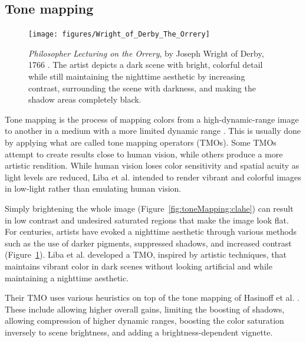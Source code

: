 \documentclass{sig-alternate}
\begin{document}
\subsection{Tone mapping}
\label{sec:toneMapping}

\begin{figure}
\centering
\texttt{[image: figures/Wright\_of\_Derby\_The\_Orrery]}
\caption{ \emph{Philosopher Lecturing on the Orrery}, by Joseph Wright of Derby, 1766 \cite{file:theOrrery}. The artist depicts a dark scene with bright, colorful detail while still maintaining the nighttime aesthetic by increasing contrast, surrounding the scene with darkness, and making the shadow areas completely black.~\cite{blog:Wronski2018}}
\label{fig:theOrrery}
\end{figure}


Tone mapping is the process of mapping colors from a high-dynamic-range image to another in a medium with a more limited dynamic range \cite{wiki:ToneMapping}. 
This is usually done by applying what are called tone mapping operators (TMOs). Some TMOs attempt to create results close to human vision, while others produce a more artistic rendition. While human vision loses color sensitivity and spatial acuity as light levels are reduced, Liba et al. intended to render vibrant and colorful images in low-light rather than emulating human vision.~\cite{Liba2019}

Simply brightening the whole image (Figure~\ref{fig:toneMapping:clahe}) can result in low contrast and undesired saturated regions that make the image look flat. For centuries, artists have evoked a nighttime aesthetic through various methods such as the use of darker pigments, suppressed shadows, and increased contrast (Figure~\ref{fig:theOrrery}).
Liba et al. developed a TMO, inspired by artistic techniques, that maintains vibrant color in dark scenes without looking artificial and while maintaining a nighttime aesthetic. 

Their TMO uses various heuristics on top of the tone mapping of Hasinoff et al. \cite{Hasinoff2016}. These include allowing higher overall gains, limiting the boosting of shadows, allowing compression of higher dynamic ranges, boosting the color saturation inversely to scene brightness, and adding a brightness-dependent vignette.~\cite{Liba2019}

\end{document}

